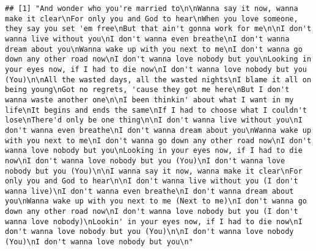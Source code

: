 \documentclass[]{article}
\newenvironment{Shaded}{\begin{snugshade}}{\end{snugshade}}
\newcommand{\KeywordTok}[1]{\textcolor[rgb]{0.13,0.29,0.53}{\textbf{#1}}}
\newcommand{\NormalTok}[1]{#1}
\newcommand{\OperatorTok}[1]{\textcolor[rgb]{0.81,0.36,0.00}{\textbf{#1}}}
\begin{document}
\begin{Shaded}
\end{Shaded}

\begin{verbatim}
## [1] "And wonder who you're married to\n\nWanna say it now, wanna make it clear\nFor only you and God to hear\nWhen you love someone, they say you set 'em free\nBut that ain't gonna work for me\n\nI don't wanna live without you\nI don't wanna even breathe\nI don't wanna dream about you\nWanna wake up with you next to me\nI don't wanna go down any other road now\nI don't wanna love nobody but you\nLooking in your eyes now, if I had to die now\nI don't wanna love nobody but you (You)\n\nAll the wasted days, all the wasted nights\nI blame it all on being young\nGot no regrets, 'cause they got me here\nBut I don't wanna waste another one\n\nI been thinkin' about what I want in my life\nIt begins and ends the same\nIf I had to choose what I couldn't lose\nThere'd only be one thing\n\nI don't wanna live without you\nI don't wanna even breathe\nI don't wanna dream about you\nWanna wake up with you next to me\nI don't wanna go down any other road now\nI don't wanna love nobody but you\nLooking in your eyes now, if I had to die now\nI don't wanna love nobody but you (You)\nI don't wanna love nobody but you (You)\n\nI wanna say it now, wanna make it clear\nFor only you and God to hear\n\nI don't wanna live without you (I don't wanna live)\nI don't wanna even breathe\nI don't wanna dream about you\nWanna wake up with you next to me (Next to me)\nI don't wanna go down any other road now\nI don't wanna love nobody but you (I don't wanna love nobody)\nLookin' in your eyes now, if I had to die now\nI don't wanna love nobody but you (You)\n\nI don't wanna love nobody (You)\nI don't wanna love nobody but you\n"                                                                                                                                       

\end{verbatim}
\end{document}
